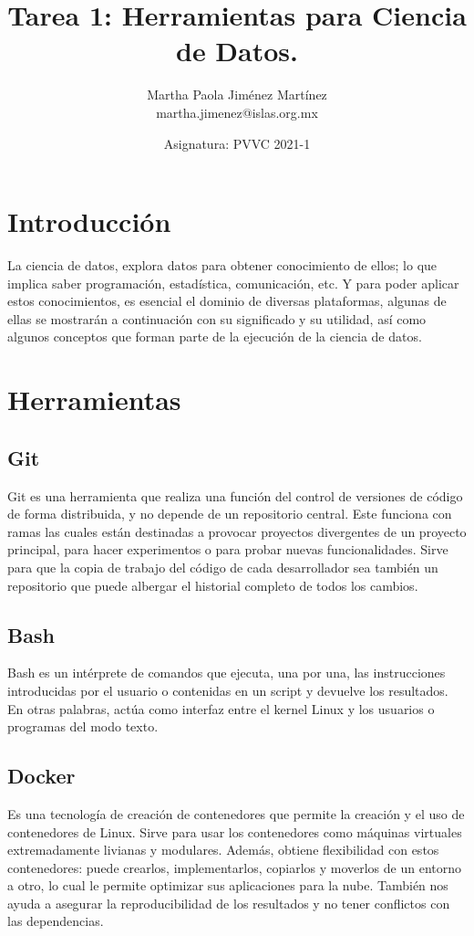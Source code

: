\documentclass[12pt,letterpaper]{article}
\begin{document}
\title{\textbf{Tarea 1: Herramientas para Ciencia de Datos.}} \author{Martha Paola Jiménez
Martínez \\
\small{martha.jimenez@islas.org.mx}}
\date{ \small{Asignatura: PVVC 2021-1}
} 
\maketitle


\section*{Introducción}
La ciencia de datos, explora datos para obtener conocimiento de ellos; lo que implica saber programación, estadística, comunicación, etc. Y para poder aplicar estos conocimientos, es esencial el dominio de diversas plataformas, algunas de ellas se mostrarán a continuación con su significado y su utilidad, así como algunos conceptos que forman parte de la ejecución de la ciencia de datos.

\section*{Herramientas}
\subsection*{Git}
Git es una herramienta que realiza una función del control de versiones de
código de forma distribuida, y no depende de un repositorio central. Este
funciona con ramas las cuales están destinadas a provocar proyectos divergentes
de un proyecto principal, para hacer experimentos o para probar nuevas
funcionalidades.
\citep{rubio_2020}
Sirve para que la copia de trabajo del código de cada desarrollador sea también
un repositorio que puede albergar el historial completo de todos los cambios.
\citep{bitbucket_git}

\subsection*{Bash}
Bash es un intérprete de comandos que ejecuta, una por una, las instrucciones
introducidas por el usuario o contenidas en un script y devuelve los resultados.
En otras palabras, actúa como interfaz entre el kernel Linux y los usuarios o
programas del modo texto.
\citep{canepa_2018}

\subsection*{Docker}
Es una tecnología de creación de contenedores que permite la creación y el uso
de contenedores de Linux. Sirve para usar los contenedores como máquinas
virtuales extremadamente livianas y modulares. Además, obtiene flexibilidad con
estos contenedores: puede crearlos, implementarlos, copiarlos y moverlos de un
entorno a otro, lo cual le permite optimizar sus aplicaciones para la nube.
\citep{redhat_docker}
También nos ayuda a asegurar la reproducibilidad de los resultados y no tener conflictos con las dependencias.
\end{document}
